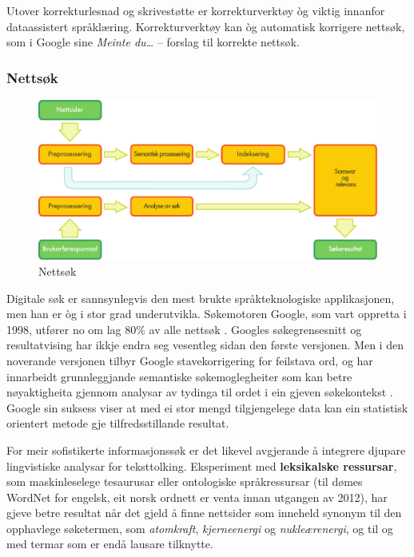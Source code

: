 \begin{multicols}{2}
Utover korrekturlesnad og skrivestøtte er korrekturverktøy òg viktig innanfor dataassistert språklæring. Korrekturverktøy kan òg automatisk korrigere nettsøk, som i Google sine \textit{Meinte du…}  -- forslag til korrekte nettsøk.

\subsubsection{Nettsøk}

\begin{figure}[htb]
  \center
  \includegraphics[width=\textwidth]{../_media/norwegian-nynorsk/web_search_architecture}
  \caption{Nettsøk}
  \label{fig:websearcharch_no}
 \end{figure}

Digitale søk er sannsynlegvis den mest brukte språkteknologiske applikasjonen, men han er òg i stor grad underutvikla. Søkemotoren Google, som vart oppretta i 1998, utfører no om lag 80\% av alle nettsøk \cite{spi1}. 
Googles søkegrensesnitt og resultatvising har ikkje endra seg vesentleg sidan den første versjonen. Men i den noverande versjonen tilbyr Google stavekorrigering for feilstava ord, og har innarbeidt grunnleggjande semantiske søkemoglegheiter som kan betre nøyaktigheita gjennom analysar av tydinga til ordet i ein gjeven søkekontekst \cite{pc1}. Google sin suksess viser at med ei stor mengd tilgjengelege data kan ein statistisk orientert metode gje tilfredsstillande resultat. 

For meir sofistikerte informasjonssøk er det likevel avgjerande å integrere djupare lingvistiske analysar for teksttolking. Eksperiment med \textbf{leksikalske ressursar}, som maskinleselege tesaurusar eller ontologiske språkressursar (til dømes WordNet for engelsk, eit norsk ordnett er venta innan utgangen av 2012), har gjeve betre resultat når det gjeld å finne nettsider som inneheld synonym til den opphavlege søketermen, som
\textit{atomkraft}, \textit{kjerneenergi} og \textit{nukleærenergi}, og til og med termar som er endå lausare tilknytte.  


\end{multicols}
